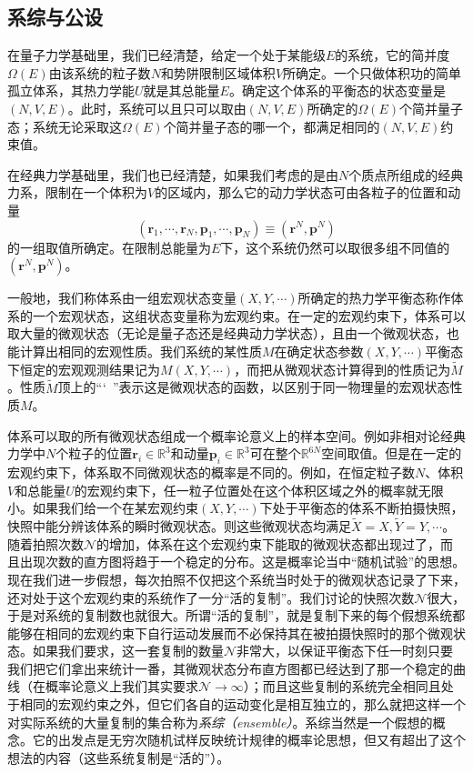 \documentclass[main.tex]{subfiles}
\begin{document}
\subsection{系综与公设}


在量子力学基础里，我们已经清楚，给定一个处于某能级$E$的系统，它的简并度$\Omega\left(E\right)$由该系统的粒子数$N$和势阱限制区域体积$V$所确定。一个只做体积功的简单孤立体系，其热力学能$U$就是其总能量$E$。确定这个体系的平衡态的状态变量是$\left(N,V,E\right)$。此时，系统可以且只可以取由$\left(N,V,E\right)$所确定的$\Omega\left(E\right)$个简并量子态；系统无论采取这$\Omega\left(E\right)$个简并量子态的哪一个，都满足相同的$\left(N,V,E\right)$约束值。

在经典力学基础里，我们也已经清楚，如果我们考虑的是由$N$个质点所组成的经典力系，限制在一个体积为$V$的区域内，那么它的动力学状态可由各粒子的位置和动量
\[\left(\mathbf{r}_1,\cdots,\mathbf{r}_N,\mathbf{p}_1,\cdots,\mathbf{p}_N\right)\equiv\left(\mathbf{r}^N,\mathbf{p}^N\right)\]
的一组取值所确定。在限制总能量为$E$下，这个系统仍然可以取很多组不同值的$\left(\mathbf{r}^N,\mathbf{p}^N\right)$。

一般地，我们称体系由一组宏观状态变量$\left(X,Y,\cdots\right)$所确定的热力学平衡态称作体系的一个宏观状态，这组状态变量称为宏观约束。在一定的宏观约束下，体系可以取大量的微观状态（无论是量子态还是经典动力学状态），且由一个微观状态，也能计算出相同的宏观性质。我们系统的某性质$M$在确定状态参数$\left(X,Y,\cdots\right)$平衡态下恒定的宏观观测结果记为$M\left(X,Y,\cdots\right)$，而把从微观状态计算得到的性质记为$\tilde{M}$。性质$\tilde{M}$顶上的“\char`~”表示这是微观状态的函数，以区别于同一物理量的宏观状态性质$M$。

体系可以取的所有微观状态组成一个概率论意义上的样本空间。例如非相对论经典力学中$N$个粒子的位置$\mathbf{r}_i\in\mathbb{R}^3$和动量$\mathbf{p}_i\in\mathbb{R}^3$可在整个$\mathbb{R}^{6N}$空间取值。但是在一定的宏观约束下，体系取不同微观状态的概率是不同的。例如，在恒定粒子数$N$、体积$V$和总能量$U$的宏观约束下，任一粒子位置处在这个体积区域之外的概率就无限小。如果我们给一个在某宏观约束$\left(X,Y,\cdots\right)$下处于平衡态的体系不断拍摄快照，快照中能分辨该体系的瞬时微观状态。则这些微观状态均满足$\tilde{X}=X,\tilde{Y}=Y,\cdots$。随着拍照次数$\mathcal{N}$的增加，体系在这个宏观约束下能取的微观状态都出现过了，而且出现次数的直方图将趋于一个稳定的分布。这是概率论当中“随机试验”的思想。现在我们进一步假想，每次拍照不仅把这个系统当时处于的微观状态记录了下来，还对处于这个宏观约束的系统作了一分“活的复制”。我们讨论的快照次数$\mathcal{N}$很大，于是对系统的复制数也就很大。所谓“活的复制”，就是复制下来的每个假想系统都能够在相同的宏观约束下自行运动发展而不必保持其在被拍摄快照时的那个微观状态。如果我们要求，这一套复制的数量$\mathcal{N}$非常大，以保证平衡态下任一时刻只要我们把它们拿出来统计一番，其微观状态分布直方图都已经达到了那一个稳定的曲线（在概率论意义上我们其实要求$\mathcal{N}\rightarrow\infty$）；而且这些复制的系统完全相同且处于相同的宏观约束之外，但它们各自的运动变化是相互独立的，那么就把这样一个对实际系统的大量复制的集合称为\emph{系综（ensemble）}。系综当然是一个假想的概念。它的出发点是无穷次随机试样反映统计规律的概率论思想，但又有超出了这个想法的内容（这些系统复制是“活的”）。
\end{document}
